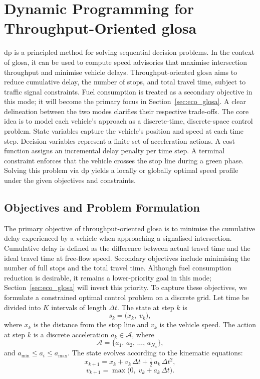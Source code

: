 \section{Dynamic Programming for Throughput-Oriented \ac{glosa}}
\label{sec:flow_glosa}

\ac{dp} is a principled method for solving sequential decision problems. In the context of \ac{glosa}, it can be used to compute speed advisories that maximise intersection throughput and minimise vehicle delays. Throughput-oriented \ac{glosa} aims to reduce cumulative delay, the number of stops, and total travel time, subject to traffic signal constraints. Fuel consumption is treated as a secondary objective in this mode; it will become the primary focus in Section~\ref{sec:eco_glosa}. A clear delineation between the two modes clarifies their respective trade-offs.
\mynewline
The core idea is to model each vehicle’s approach as a discrete-time, discrete-space control problem. State variables capture the vehicle’s position and speed at each time step. Decision variables represent a finite set of acceleration actions. A cost function assigns an incremental delay penalty per time step. A terminal constraint enforces that the vehicle crosses the stop line during a green phase. Solving this problem via \ac{dp} yields a locally or globally optimal speed profile under the given objectives and constraints.

\subsection{Objectives and Problem Formulation}
\label{subsec:flow_dp_formulation}

The primary objective of throughput-oriented \ac{glosa} is to minimise the cumulative delay experienced by a vehicle when approaching a signalised intersection. Cumulative delay is defined as the difference between actual travel time and the ideal travel time at free-flow speed. Secondary objectives include minimising the number of full stops and the total travel time. Although fuel consumption reduction is desirable, it remains a lower-priority goal in this mode; Section~\ref{sec:eco_glosa} will invert this priority.
\mynewline
To capture these objectives, we formulate a constrained optimal control problem on a discrete grid. Let time be divided into $K$ intervals of length $\Delta t$. The state at step $k$ is 
\[
s_k = \bigl(x_k,\;v_k\bigr),
\]
where $x_k$ is the distance from the stop line and $v_k$ is the vehicle speed. The action at step $k$ is a discrete acceleration $a_k\in\mathcal{A}$, where
\[
\mathcal{A}=\{a_1,\,a_2,\,\dots,\,a_{N_a}\},
\]
and $a_{\min}\le a_i\le a_{\max}$. The state evolves according to the kinematic equations:
\[
x_{k+1} = x_k + v_k\,\Delta t + \tfrac12\,a_k\,\Delta t^2,
\]
\[
v_{k+1} = \max\bigl(0,\;v_k + a_k\,\Delta t\bigr).
\]

